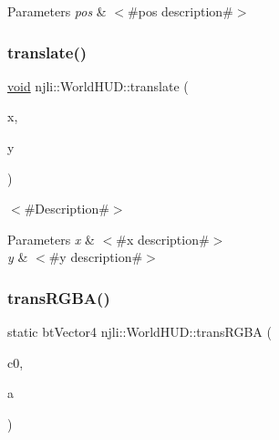 \begin{DoxyParams}{Parameters}
{\em pos} & $<$\#pos description\#$>$ \\
\hline
\end{DoxyParams}
\mbox{\label{classnjli_1_1_world_h_u_d_abd989561682767b35d557221124e4883}} 
\subsubsection{\texorpdfstring{translate()}{translate()}\hspace{0.1cm}{\footnotesize\ttfamily [2/2]}}
{\footnotesize\ttfamily \mbox{\hyperlink{_thread_8h_af1e856da2e658414cb2456cb6f7ebc66}{void}} njli\+::\+World\+H\+U\+D\+::translate (\begin{DoxyParamCaption}\item[{\mbox{\hyperlink{_util_8h_a5f6906312a689f27d70e9d086649d3fd}{f32}}}]{x,  }\item[{\mbox{\hyperlink{_util_8h_a5f6906312a689f27d70e9d086649d3fd}{f32}}}]{y }\end{DoxyParamCaption})}

$<$\#\+Description\#$>$


\begin{DoxyParams}{Parameters}
{\em x} & $<$\#x description\#$>$ \\
\hline
{\em y} & $<$\#y description\#$>$ \\
\hline
\end{DoxyParams}
\mbox{\label{classnjli_1_1_world_h_u_d_a62ce15067e1954e3c1a1d861bf1f3ca6}} 
\subsubsection{\texorpdfstring{trans\+R\+G\+B\+A()}{transRGBA()}}
{\footnotesize\ttfamily static bt\+Vector4 njli\+::\+World\+H\+U\+D\+::trans\+R\+G\+BA (\begin{DoxyParamCaption}\item[{const bt\+Vector4 \&}]{c0,  }\item[{\mbox{\hyperlink{_util_8h_aed742c436da53c1080638ce6ef7d13de}{u8}}}]{a }\end{DoxyParamCaption})\hspace{0.3cm}{\ttfamily [static]}}

